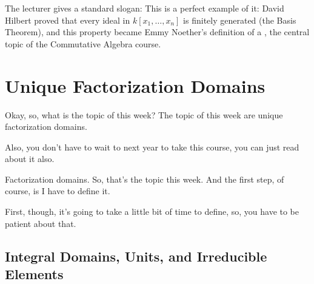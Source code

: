 \begin{insight}
The lecturer gives a standard slogan:  This is a perfect example of it: David Hilbert proved that every ideal in $k[x_1, \dots, x_n]$ is finitely generated (the Basis Theorem), and this property became Emmy Noether's definition of a , the central topic of the Commutative Algebra course.
\end{insight}

\section{Unique Factorization Domains}

\begin{speech}[00:04:50 - 00:05:18]
Okay, so, what is the topic of this week? The topic of this week are unique factorization domains. 

Also, you don't have to wait to next year to take this course, you can just read about it also.

Factorization domains.  So, that's the topic this week. And the first step, of course, is I have to define it.

First, though, it's going to take a little bit of time to define, so, you have to be patient about that.
\end{speech}

\begin{hidden}
\end{hidden}

\subsection{Integral Domains, Units, and Irreducible Elements}

